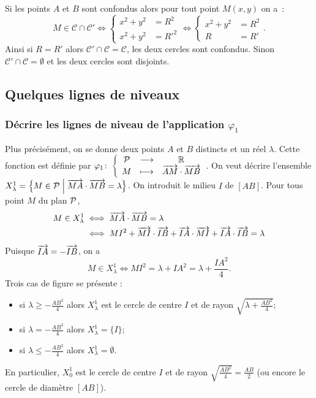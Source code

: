 Si les points \(A\) et \(B\) sont confondus alors pour tout point \(M(x,y)\) on a~:
\begin{equation}
  M \in \mathcal{C} \cap \mathcal{C}' \iff \begin{cases} x^2+y^2 & =R^2 \\ x^2+y^2&=R'^2 \end{cases} \iff \begin{cases} x^2+y^2 & =R^2 \\ R&=R' \end{cases}.
\end{equation}
Ainsi si \(R=R'\) alors \(\mathcal{C}' \cap \mathcal{C}=\mathcal{C}\), les deux cercles sont confondus. Sinon \(\mathcal{C}' \cap \mathcal{C}=\emptyset\) et les deux cercles sont disjoints.

\subsection{Quelques lignes de niveaux}
\subsubsection{Décrire les lignes de niveau de l'application \(\varphi_1\)}
Plus précisément, on se  donne deux points \(A\) et \(B\) distincts et un réel \(\lambda\). Cette fonction est définie par \(\fonction{\varphi_1}{\P}{\R}{M}{\vect{AM} \cdot \vect{MB}}\). On veut décrire l'ensemble \(X_{\lambda}^{1}=\enstq{M \in \P}{\vect{MA} \cdot \vect{MB} = \lambda}\). On introduit le milieu \(I\) de \([AB]\). Pour tous point \(M\) du plan \(\P\),
\begin{align}
  M \in X_{\lambda}^{1} & \iff \vect{MA} \cdot \vect{MB} = \lambda \\ & \iff MI^2 + \vect{MI} \cdot \vect{IB} + \vect{IA} \cdot \vect{MI} + \vect{IA} \cdot \vect{IB} = \lambda
\end{align}
Puisque \(\vect{IA}=-\vect{IB}\), on a 
\begin{equation}
  M \in X_{\lambda}^{1}  \iff MI^2=\lambda + IA^2=\lambda + \frac{IA^2}{4}.
\end{equation}
Trois cas de figure se présente :
\begin{itemize}
\item si \(\lambda \geqslant -\frac{AB^2}{4}\) alors \(X_{\lambda}^{1}\) est le cercle de centre \(I\) et de rayon \(\sqrt{\lambda +\frac{AB^2}{4}}\);
\item si \(\lambda = -\frac{AB^2}{4}\) alors \(X_{\lambda}^{1}=\{I\}\);
\item si \(\lambda \leqslant -\frac{AB^2}{4}\) alors \(X_{\lambda}^{1}=\emptyset\).
\end{itemize}
En particulier, \(X_{0}^{1}\) est le cercle de centre \(I\) et de rayon \(\sqrt{\frac{AB^2}{4}}=\frac{AB}{2}\) (ou encore le cercle de diamètre \([AB]\)).

